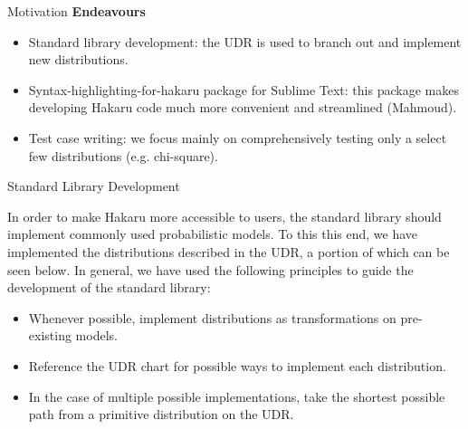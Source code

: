 \documentclass[22pt]{beamer}
\begin{document}
\begin{frame}[fragile]
\begin{textblock}{5}
\begin{textblock}{5}
\begin{block}{\Large{Motivation}}
\normalsize{\textbf{Endeavours}}

\scriptsize{
\begin{itemize}
  \item Standard library development: the UDR is used to branch out and implement new distributions. 
  \item Syntax-highlighting-for-hakaru package for Sublime Text: this package makes developing Hakaru code much more convenient and streamlined (Mahmoud).
  \item Test case writing: we focus mainly on comprehensively testing only a select few distributions (e.g. chi-square).
\end{itemize}
        }

\bigskip


\end{block}


\begin{block}{\Large{Standard Library Development}}
\justifying

\scriptsize{In order to make Hakaru more accessible to users, the standard library should implement commonly used probabilistic models. To this this end, we have implemented the distributions described in the UDR, a portion of which can be seen below. In general, we have used the following principles to guide the development of the standard library: 


\scriptsize{

\bigskip
\begin{itemize}
  \item Whenever possible, implement distributions as transformations on pre-existing models.
  \item Reference the UDR chart for possible ways to implement each distribution.
  \item In the case of multiple possible implementations, take the shortest possible path from a primitive distribution on the UDR.
\end{itemize}
        }
}

\bigskip


\end{block}
\end{textblock}
\end{textblock}
\end{frame}
\end{document}
